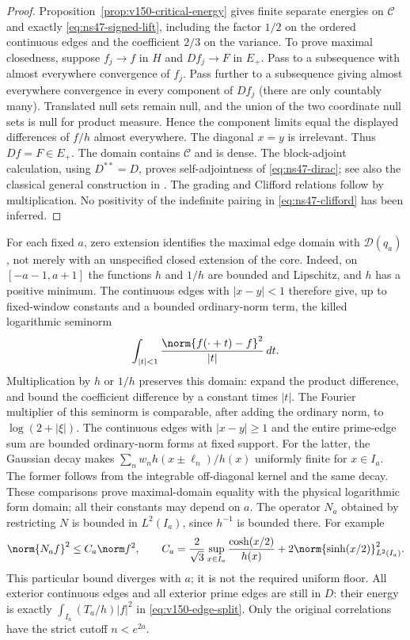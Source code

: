 \begin{proof}
Proposition~\ref{prop:v150-critical-energy} gives finite separate energies
on $\mathcal C$ and exactly \eqref{eq:ns47-signed-lift}, including the
factor $1/2$ on the ordered continuous edges and the coefficient $2/3$
on the variance. To prove maximal closedness, suppose $f_j\to f$ in
$H$ and $Df_j\to F$ in $E_+$. Pass to a subsequence with almost
everywhere convergence of $f_j$. Pass further to a subsequence giving
almost everywhere convergence in every component of $Df_j$ (there are
only countably many). Translated null sets remain null, and the union
of the two coordinate null sets is null for product measure. Hence the
component limits equal the displayed differences of $f/h$ almost
everywhere. The diagonal $x=y$ is irrelevant. Thus $Df=F\in E_+$.
The domain contains $\mathcal C$ and is dense. The block-adjoint
calculation, using $D^{**}=D$, proves self-adjointness of
\eqref{eq:ns47-dirac}; see also the classical general construction in
\cite[Appendix A, Proposition A.1]{Holzmann2021NS47}. The grading and
Clifford relations follow by multiplication. No positivity of the
indefinite pairing in \eqref{eq:ns47-clifford} has been inferred.
\end{proof}

For each fixed $a$, zero extension identifies the maximal edge domain
with $\mathcal D(q_a)$, not merely with an unspecified closed extension
of the core. Indeed, on $[-a-1,a+1]$ the functions $h$ and $1/h$ are
bounded and Lipschitz, and $h$ has a positive minimum. The continuous
edges with $|x-y|<1$ therefore give, up to fixed-window constants and a
bounded ordinary-norm term, the killed logarithmic seminorm
\[
 \int_{|t|<1}\frac{\norm{f(\cdot+t)-f}^2}{|t|}\,dt.
\]
Multiplication by $h$ or $1/h$ preserves this domain: expand the
product difference, and bound the coefficient difference by a constant
times $|t|$. The Fourier multiplier of this seminorm is comparable,
after adding the ordinary norm, to $\log(2+|\xi|)$.
The continuous edges with $|x-y|\ge1$ and the entire prime-edge sum
are bounded ordinary-norm forms at fixed support. For the latter,
the Gaussian decay makes $\sum_n w_nh(x\pm\ell_n)/h(x)$ uniformly
finite for $x\in I_a$. The former follows from the integrable
off-diagonal kernel and the same decay. These comparisons prove
maximal-domain equality with the physical logarithmic form domain;
all their constants may depend on $a$. The operator $N_a$ obtained
by restricting $N$ is bounded in $L^2(I_a)$, since $h^{-1}$ is bounded
there. For example
\begin{equation}\label{eq:ns47-local-cost}
 \norm{N_af}^2\le C_a\norm f^2,\qquad
 C_a=\frac{2}{\sqrt3}\sup_{x\in I_a}\frac{\cosh(x/2)}{h(x)}
          +2\norm{\sinh(x/2)}_{L^2(I_a)}^2.
\end{equation}
This particular bound diverges with $a$; it is not the required uniform
floor. All exterior continuous edges and all exterior prime edges are
still in $D$: their energy is exactly
$\int_{I_a}(T_a/h)|f|^2$ in \eqref{eq:v150-edge-split}.
Only the original correlations have the strict cutoff $n<e^{2a}$.

